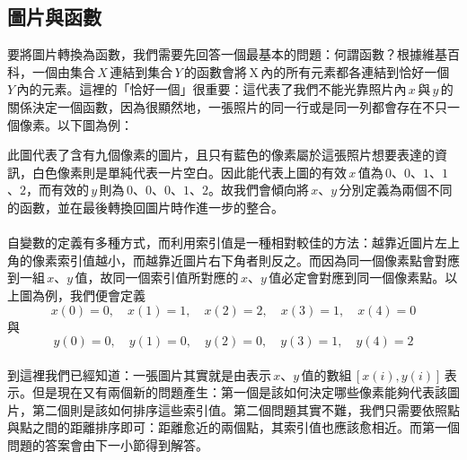   \subsection{圖片與函數}
  要將圖片轉換為函數，我們需要先回答一個最基本的問題：何謂函數？根據維基百科，一個由集合\,\(X\)\,連結到集合\,\(Y\)\,的函數會將\,X\,內的所有元素都各連結到恰好一個 \,\(Y\)\,內的元素。這裡的\makebox[4pt][c]{}「\makebox[1pt][c]{}恰好一個\makebox[1pt][c]{}」\makebox[4pt][c]{}很重要：這代表了我們不能光靠照片內\,\(x\)\,與\,\(y\)\,的關係決定一個函數，因為很顯然地，一張照片的同一行或是同一列都會存在不只一個像素。以下圖為例：
  \begin{center}
  \end{center}
  \noindent 此圖代表了含有九個像素的圖片，且只有藍色的像素屬於這張照片想要表達的資訊，白色像素則是單純代表一片空白。因此能代表上圖的有效\,\(x\)\,值為\,\(0\)、\(0\)、\(1\)、\(1\)、\(2\)，而有效的\,\(y\)\,則為\,\(0\)、\(0\)、\(0\)、\(1\)、\(2\)。故我們會傾向將\,\(x\)、\(y\)\,分別定義為兩個不同的函數，並在最後轉換回圖片時作進一步的整合。
  \\\\
  自變數的定義有多種方式，而利用索引值是一種相對較佳的方法：越靠近圖片左上角的像素索引值越小，而越靠近圖片右下角者則反之。而因為同一個像素點會對應到一組\,\(x\)、\(y\)\,值，故同一個索引值所對應的\,\(x\)、\(y\)\,值必定會對應到同一個像素點。以上圖為例，我們便會定義
  \[x(0)=0,\quad x(1)=1,\quad x(2)=2,\quad x(3)=1,\quad x(4)=0\]
  與
  \[y(0)=0,\quad y(1)=0,\quad y(2)=0,\quad y(3)=1,\quad y(4)=2\]
  \\
  到這裡我們已經知道：一張圖片其實就是由表示\,\(x\)、\(y\)\,值的數組\,\([x(i), y(i)]\)\,表示。但是現在又有兩個新的問題產生：第一個是該如何決定哪些像素能夠代表該圖片，第二個則是該如何排序這些索引值。第二個問題其實不難，我們只需要依照點與點之間的距離排序即可：距離愈近的兩個點，其索引值也應該愈相近。而第一個問題的答案會由下一小節得到解答。


